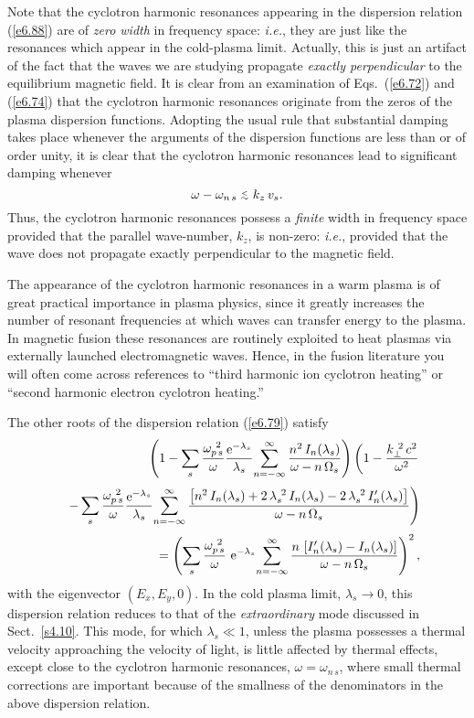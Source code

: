 Note that the cyclotron harmonic resonances appearing in the dispersion
relation (\ref{e6.88}) are of {\em zero width}\/  in frequency space: {\em i.e.}, they are
just like the resonances which appear in the cold-plasma limit. 
Actually, this is just an artifact of the fact that the waves we are studying
propagate {\em exactly perpendicular}\/ to the equilibrium magnetic field. It is
clear from an examination of Eqs.~(\ref{e6.72}) and (\ref{e6.74}) that the cyclotron
harmonic resonances originate from the zeros of the plasma dispersion
functions. Adopting the usual rule that substantial damping takes place
whenever the arguments of the dispersion functions are less than or of
order unity, it is clear that the cyclotron harmonic resonances lead to
significant damping whenever
\begin{equation}
\omega - \omega_{n\,s} \stackrel {_{\normalsize<}}{_{\normalsize \sim}} k_z\,v_s.
\end{equation}
Thus, the cyclotron harmonic resonances possess a {\em finite}\/  width in frequency
space provided that the parallel wave-number, $k_z$, is non-zero: {\em i.e.},
provided that the wave does not propagate exactly perpendicular to the magnetic
field.

The appearance of the cyclotron harmonic resonances in a warm plasma
 is  of great practical
importance in plasma physics, since it greatly increases the number of
resonant frequencies at which waves can transfer energy to the
plasma. In magnetic fusion these resonances are routinely exploited to
heat plasmas via  externally launched electromagnetic waves. Hence, in
the fusion literature you will often come across references to
``third harmonic ion cyclotron heating'' or ``second harmonic electron
cyclotron heating.''

The other roots of the dispersion relation (\ref{e6.79}) satisfy
\begin{eqnarray}
&&\left(1 - \sum_s\frac{\omega_{p\,s}^{~2}}{\omega}
\frac{{\rm e}^{-\lambda_s}}{\lambda_s} \!\sum_{n=-\infty}^\infty \frac{n^2\,I_n(
\lambda_s)}{\omega-n\,{\Omega}_s}
\right) \left(1 -\frac{k_\perp^{~2}\,c^2}{\omega^2}\right.\nonumber\\[0.5ex]
&&\left.- 
\sum_s \frac{\omega_{p\,s}^{~2}}{\omega} \frac{{\rm e}^{-\lambda_s}}{\lambda_s}\!
\sum_{n=-\infty}^\infty \frac{\left[n^2\,I_n(\lambda_s) +2 \,\lambda_s^{~2}\,
I_n(\lambda_s) - 2\,\lambda_s^{~2}\,I_n'(\lambda_s)\right]}
{\omega-n\,{\Omega}_s}
\right)\nonumber\\[0.5ex]
&&= \left(\sum_s \frac{\omega_{p\,s}^{~2}}{\omega}
\,\,{\rm e}^{-\lambda_s}\! \sum_{n=-\infty}^\infty \frac{n\,\left[I_n'(\lambda_s)
-I_n(\lambda_s)\right]}{\omega-n\,{\Omega}_s}\right)^2,\label{e6.91}
\end{eqnarray}
with the eigenvector $(E_x, E_y, 0)$. In the cold plasma limit, $\lambda_s\rightarrow
0$, this dispersion relation reduces to that of the {\em extraordinary}\/  mode 
discussed in Sect.~\ref{s4.10}. This mode, for which $\lambda_s\ll 1$, unless the
plasma possesses a thermal velocity approaching the velocity of light, is little
affected by thermal effects, except close to the cyclotron harmonic
resonances, $\omega=\omega_{n\,s}$, where small thermal corrections are important
because of the smallness of the denominators in the above dispersion relation.

